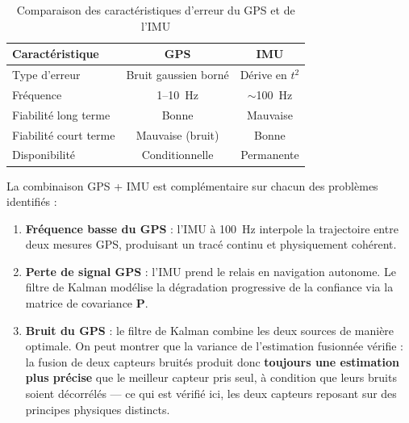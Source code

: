 \begin{table}[htbp]
    \centering
    \caption{Comparaison des caractéristiques d'erreur du GPS et de l'IMU}
    \begin{tabular}{lcc}
        \hline
        \textbf{Caractéristique} & \textbf{GPS} & \textbf{IMU} \\
        \hline
        Type d'erreur        & Bruit gaussien borné & Dérive en $t^2$ \\
        Fréquence            & 1--10~Hz             & $\sim$100~Hz    \\
        Fiabilité long terme & Bonne                & Mauvaise        \\
        Fiabilité court terme & Mauvaise (bruit)    & Bonne           \\
        Disponibilité        & Conditionnelle       & Permanente      \\
        \hline
    \end{tabular}
    \label{tab:capteurs}
\end{table}

La combinaison GPS + IMU est complémentaire sur chacun des problèmes identifiés :

\begin{enumerate}
    \item \textbf{Fréquence basse du GPS} : l'IMU à 100~Hz interpole la
    trajectoire entre deux mesures GPS, produisant un tracé continu et
    physiquement cohérent.
    \item \textbf{Perte de signal GPS} : l'IMU prend le relais en navigation
    autonome. Le filtre de Kalman modélise la dégradation progressive de
    la confiance via la matrice de covariance $\mathbf{P}$.
    \item \textbf{Bruit du GPS} : le filtre de Kalman combine les deux
    sources de manière optimale. On peut montrer que la variance de
    l'estimation fusionnée vérifie : la fusion de deux capteurs bruités produit
    donc \textbf{toujours une estimation plus précise} que le meilleur capteur
    pris seul, à condition que leurs bruits soient décorrélés — ce qui est
    vérifié ici, les deux capteurs reposant sur des principes physiques distincts.
\end{enumerate}
